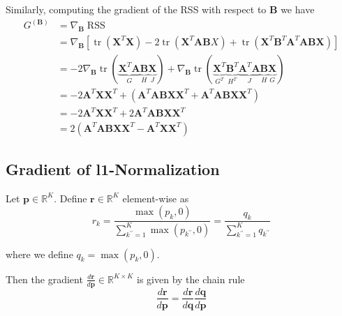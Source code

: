 \documentclass[oneside]{article}
\begin{document}
Similarly, computing the gradient of the RSS with respect to $\mathbf{B}$ we have
\begin{equation}
    \label{eq:gradB}
    \begin{aligned}
        G^{(\mathbf{B})} &= \nabla_\mathbf{B} \operatorname{RSS} \\
        &= \nabla_\mathbf{B} \left[ \operatorname{tr}(\mathbf{X}^T \mathbf{X}) - 2 \operatorname{tr}(\mathbf{X}^T \mathbf{A} \mathbf{B} X) + \operatorname{tr}(\mathbf{X}^T \mathbf{B}^T \mathbf{A}^T \mathbf{A} \mathbf{B} \mathbf{X}) \right] \\
        &= - 2 \nabla_\mathbf{B} \operatorname{tr}(\underbrace{\mathbf{X}^T \mathbf{A}}_{G} \underbrace{\mathbf{B}}_{H} \underbrace{\mathbf{X}}_{J}) + \nabla_\mathbf{B} \operatorname{tr}(\underbrace{\mathbf{X}^T}_{G^T} \underbrace{\mathbf{B}^T}_{H^T} \underbrace{\mathbf{A}^T \mathbf{A}}_{J} \underbrace{\mathbf{B}}_{H} \underbrace{\mathbf{X}}_{G}) \\
        & = - 2 \mathbf{A}^T \mathbf{X} \mathbf{X}^T + \left( \mathbf{A}^T \mathbf{A} \mathbf{B} \mathbf{X} \mathbf{X}^T + \mathbf{A}^T \mathbf{A} \mathbf{B} \mathbf{X} \mathbf{X}^T \right) \\
        & = - 2 \mathbf{A}^T \mathbf{X} \mathbf{X}^T + 2 \mathbf{A}^T \mathbf{A} \mathbf{B} \mathbf{X} \mathbf{X}^T  \\
        & = 2 \left( \mathbf{A}^T \mathbf{A} \mathbf{B} \mathbf{X} \mathbf{X}^T - \mathbf{A}^T \mathbf{X} \mathbf{X}^T \right)
    \end{aligned}
\end{equation}

\subsection{Gradient of l1-Normalization}
\label{subsec:gradl1}

Let $\mathbf{p} \in \mathbb{R}^K$. Define $\mathbf{r} \in \mathbb{R}^K$ element-wise as
\begin{equation}
    {r}_k = \frac{\max(p_k, 0)}{\sum_{k^{\prime \prime}=1}^K \max(p_{k^{\prime \prime}}, 0)} = \frac{q_k}{\sum_{k^{\prime \prime}=1}^K q_{k^{\prime \prime}}}
\end{equation}

where we define $q_k = \max(p_k, 0)$.

Then the gradient $\frac{d \mathbf{r}}{d \mathbf{p}} \in \mathbb{R}^{K \times K}$ is given by the chain rule
\begin{equation}
    \frac{d \mathbf{r}}{d \mathbf{p}} = \frac{d \mathbf{r}}{d \mathbf{q}} \frac{d \mathbf{q}}{d \mathbf{p}}
\end{equation}
\end{document}
